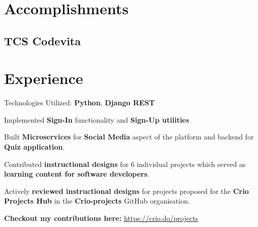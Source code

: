 \documentclass[]{deedy-resume-openfont}
\begin{document}
\begin{minipage}[t]{0.33\textwidth}
\section{Accomplishments} 
\sectionsep
\subsection{TCS Codevita}
\sectionsep

%
%

\end{minipage} 
\hfill
\begin{minipage}[t]{0.66\textwidth} 


\section{Experience}

\sectionsep
\begin{tightemize}
\item Technologies Utilized: \textbf{Python}, \textbf{Django REST}
\item Implemented \textbf{Sign-In} functionality and \textbf{Sign-Up utilities}
\item Built \textbf{Microservices} for \textbf{Social Media} aspect of the platform and backend for \textbf{Quiz application}.
\end{tightemize}

\begin{tightemize}
\item Contributed \textbf{instructional designs} for 6 individual projects which served as \textbf{learning content for software developers}.
\item Actively \textbf{reviewed instructional designs} for projects proposed for the \textbf{Crio Projects Hub} in the \textbf{Crio-projects} GitHub organisation. 
\item \textbf{Checkout my contributions here:} \href{https://crio.do/projects}{https://crio.do/projects}
\end{tightemize}


\end{minipage}
\end{document}
